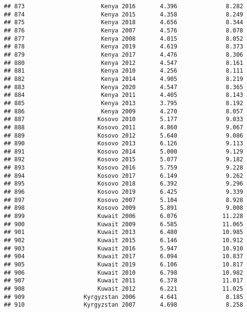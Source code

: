 \documentclass[
]{article}
\begin{document}
\begin{verbatim}
## 873                      Kenya 2016       4.396              8.282
## 874                      Kenya 2015       4.358              8.249
## 875                      Kenya 2018       4.656              8.344
## 876                      Kenya 2007       4.576              8.078
## 877                      Kenya 2008       4.015              8.052
## 878                      Kenya 2019       4.619              8.373
## 879                      Kenya 2017       4.476              8.306
## 880                      Kenya 2012       4.547              8.161
## 881                      Kenya 2010       4.256              8.111
## 882                      Kenya 2014       4.905              8.219
## 883                      Kenya 2020       4.547              8.365
## 884                      Kenya 2011       4.405              8.143
## 885                      Kenya 2013       3.795              8.192
## 886                      Kenya 2009       4.270              8.057
## 887                     Kosovo 2010       5.177              9.033
## 888                     Kosovo 2011       4.860              9.067
## 889                     Kosovo 2012       5.640              9.086
## 890                     Kosovo 2013       6.126              9.113
## 891                     Kosovo 2014       5.000              9.129
## 892                     Kosovo 2015       5.077              9.182
## 893                     Kosovo 2016       5.759              9.228
## 894                     Kosovo 2017       6.149              9.262
## 895                     Kosovo 2018       6.392              9.296
## 896                     Kosovo 2019       6.425              9.339
## 897                     Kosovo 2007       5.104              8.928
## 898                     Kosovo 2009       5.891              9.008
## 899                     Kuwait 2006       6.076             11.228
## 900                     Kuwait 2009       6.585             11.065
## 901                     Kuwait 2013       6.480             10.985
## 902                     Kuwait 2015       6.146             10.912
## 903                     Kuwait 2016       5.947             10.910
## 904                     Kuwait 2017       6.094             10.837
## 905                     Kuwait 2019       6.106             10.817
## 906                     Kuwait 2010       6.798             10.982
## 907                     Kuwait 2011       6.378             11.017
## 908                     Kuwait 2012       6.221             11.025
## 909                 Kyrgyzstan 2006       4.641              8.185
## 910                 Kyrgyzstan 2007       4.698              8.258

\end{verbatim}
\end{document}

